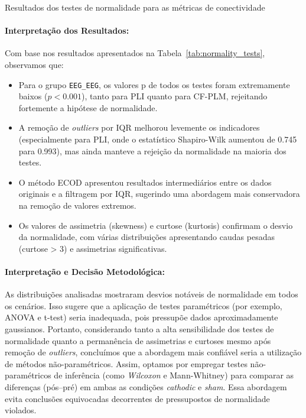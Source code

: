 \begin{table}[htbp]
    \centering
    \caption{Resultados dos testes de normalidade para as métricas de conectividade}
    \label{tab:normality_tests}
    \begin{adjustbox}{max width=1.2\textwidth}
        
    \end{adjustbox}
\end{table}

\paragraph{Interpretação dos Resultados:}
Com base nos resultados apresentados na Tabela~\ref{tab:normality_tests}, observamos que:

\begin{itemize}
    \item Para o grupo \texttt{EEG\_EEG}, os valores p de todos os testes foram extremamente baixos ($p < 0.001$), tanto para PLI quanto para CF-PLM, rejeitando fortemente a hipótese de normalidade.
    
    \item A remoção de \textit{outliers} por IQR melhorou levemente os indicadores (especialmente para PLI, onde o estatístico Shapiro-Wilk aumentou de 0.745 para 0.993), mas ainda manteve a rejeição da normalidade na maioria dos testes.
    
    \item O método ECOD apresentou resultados intermediários entre os dados originais e a filtragem por IQR, sugerindo uma abordagem mais conservadora na remoção de valores extremos.
    
    \item Os valores de assimetria (skewness) e curtose (kurtosis) confirmam o desvio da normalidade, com várias distribuições apresentando caudas pesadas (curtose > 3) e assimetrias significativas.
\end{itemize}

\paragraph{Interpretação e Decisão Metodológica:}
As distribuições analisadas mostraram desvios notáveis de normalidade em todos os cenários. Isso sugere que a aplicação de testes paramétricos (por exemplo, ANOVA e t-test) seria inadequada, pois pressupõe dados aproximadamente gaussianos. 
Portanto, considerando tanto a alta sensibilidade dos testes de normalidade quanto a permanência de assimetrias e curtoses mesmo após remoção de \textit{outliers}, concluímos que a abordagem mais confiável seria a utilização de métodos não-paramétricos.
Assim, optamos por empregar testes não-paramétricos de inferência (como \textit{Wilcoxon} e Mann-Whitney) para comparar as diferenças (pós--pré) em ambas as condições \textit{cathodic} e \textit{sham}. Essa abordagem evita conclusões equivocadas decorrentes de pressupostos de normalidade violados.
